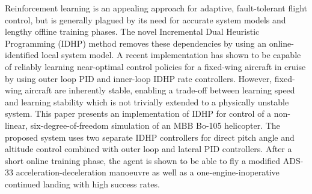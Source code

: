 Reinforcement learning is an appealing approach for adaptive, fault-tolerant flight control, but is generally plagued by its need for accurate system models and lengthy offline training phases. The novel Incremental Dual Heuristic Programming (IDHP) method removes these dependencies by using an online-identified local system model. A recent implementation has shown to be capable of reliably learning near-optimal control policies for a fixed-wing aircraft in cruise by using outer loop PID and inner-loop IDHP rate controllers. However, fixed-wing aircraft are inherently stable, enabling a trade-off between learning speed and learning stability which is not trivially extended to a physically unstable system. This paper presents an implementation of IDHP for control of a non-linear, six-degree-of-freedom simulation of an MBB Bo-105 helicopter. The proposed system uses two separate IDHP controllers for direct pitch angle and altitude control combined with outer loop and lateral PID controllers. After a short online training phase, the agent is shown to be able to fly a modified ADS-33 acceleration-deceleration manoeuvre as well as a one-engine-inoperative continued landing with high success rates. 